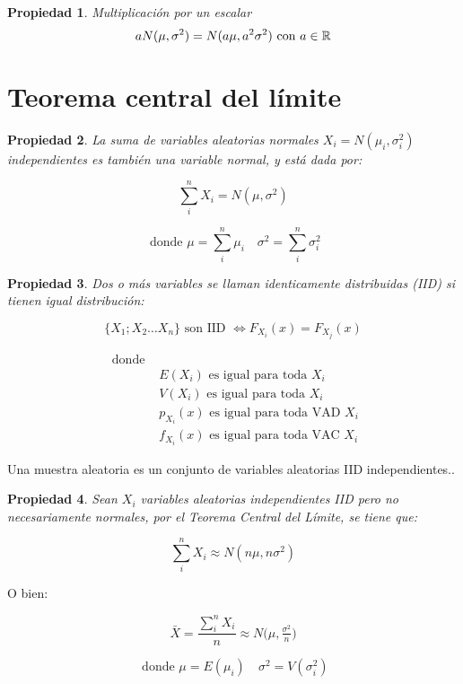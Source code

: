 \documentclass[a5paper,12pt,twoside]{book}
\newtheorem{prop}{{Propiedad}}[chapter]
\begin{document}
\begin{prop} Multiplicación por un escalar
$$ a N(\mu,\sigma^2) = N(a \mu, a^2 \sigma^2) \text{ con } a \in \mathbb{R} $$
\end{prop}

\section{Teorema central del límite}

\begin{prop}
La suma de variables aleatorias normales $X_i=N(\mu_i,\sigma_i^2)$ independientes es también una variable normal, y está dada por:
\end{prop}

$$ \sum_i^n X_i = N(\mu,\sigma^2)$$

$$ \text{ donde } \mu = \sum_i^n \mu_i \quad \sigma^2 = \sum_i^n \sigma_i^2 $$

\begin{prop}
Dos o más variables se llaman identicamente distribuidas (IID) si tienen igual distribución:
\end{prop}

$$ \{X_1;X_2 \dots X_n \} \textrm{ son IID } \iff F_{X_i}(x)=F_{X_j}(x) $$

\begin{align*}
\text{ donde } & \\
& E(X_i) \textrm{ es igual para toda } X_i \\
& V(X_i) \textrm{ es igual para toda } X_i \\
& p_{X_i}(x) \textrm{ es igual para toda VAD } X_i \\
& f_{X_i}(x) \textrm{ es igual para toda VAC } X_i
\end{align*}

Una muestra aleatoria es un conjunto de variables aleatorias IID independientes..

\begin{prop}
Sean $X_i$ variables aleatorias independientes IID pero no necesariamente normales, por el Teorema Central del Límite, se tiene que:
\end{prop}

$$ \sum_i^n X_i \approx N(n \mu,n \sigma^2) $$

O bien:

$$ \bar{X}=\dfrac{\sum_i^n X_i}{n} \approx N \big( \mu, \tfrac{\sigma^2}{n} \big) $$

$$ \text{ donde } \mu = E(\mu_i) \quad \sigma^2 = V(\sigma_i^2) $$
\end{document}
